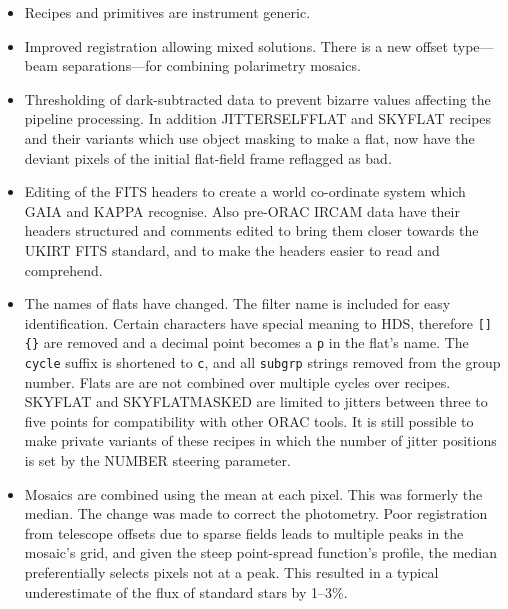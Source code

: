 \documentclass[twoside,11pt]{article}
\newcommand{\htmladdnormallink}[2]{#1}
\newcommand{\htmlref}[2]{#1}
\newcommand{\xref}[3]{#1}
\renewcommand{\_}{\texttt{\symbol{95}}}
\newcommand{\GAIA}{{\footnotesize GAIA}}
\newcommand{\KAPPA}{{\footnotesize KAPPA}}
\begin{document}
\begin{itemize}
   \item Recipes and primitives are instrument generic.
   \item \htmlref{Improved registration}{automatic_registration} allowing
      mixed solutions.  There is a new offset type---beam
      separa\-tions---for combining polarimetry mosaics.
   \item \htmlref{Thresholding}{bad_pixels} of dark-subtracted data
      to prevent bizarre values affecting the pipeline processing.
      In addition \htmlref{JITTER\_SELF\_FLAT}{JITTER\_SELF\_FLAT} and
      \htmlref{SKY\_FLAT}{SKY\_FLAT} recipes and their variants which
      use object masking to make a flat, now have the deviant pixels of
      the initial flat-field frame reflagged as bad.
   \item Editing of the FITS headers to create a world co-ordinate
      system which \xref{\GAIA}{sun214}{} and \xref{\KAPPA}{sun95}{}
      recognise.  Also pre-ORAC IRCAM data have their headers
      structured and comments edited to bring them closer towards the
      \htmladdnormallink{UKIRT FITS
      standard}{http://www.jach.hawaii.edu/JACpublic/UKIRT/software/orac/docs/orac016-fith.fm.A4.ps},
      and to make the headers easier to read and comprehend.
   \item The names of flats have changed.  The filter name is included
      for easy identification.  Certain characters have special
      meaning to HDS, therefore {\tt []\{\}} are removed and a decimal
      point becomes a {\tt p} in the flat's name.  The {\tt{\_cycle}}
      suffix is shortened to {\tt{\_c}}, and all {\tt{\_subgrp}}
      strings removed from the group number.  Flats are are not
      combined over multiple cycles over recipes.  SKY\_FLAT and
      SKY\_FLAT\_MASKED are limited to jitters between three to five
      points for compatibility with other ORAC tools.  It is still
      possible to make private variants of these recipes in which the
      number of jitter positions is set by the NUMBER steering
      parameter.
   \item Mosaics are combined using the mean at each pixel.  This was
      formerly the median.  The change was made to correct the
      photometry.  Poor registration from telescope offsets due to
      sparse fields leads to multiple peaks in the mosaic's grid, and
      given the steep point-spread function's profile, the median
      preferentially selects pixels not at a peak.  This resulted in a
      typical underestimate of the flux of standard stars by 1--3\%.

\end{itemize}
\end{document}
